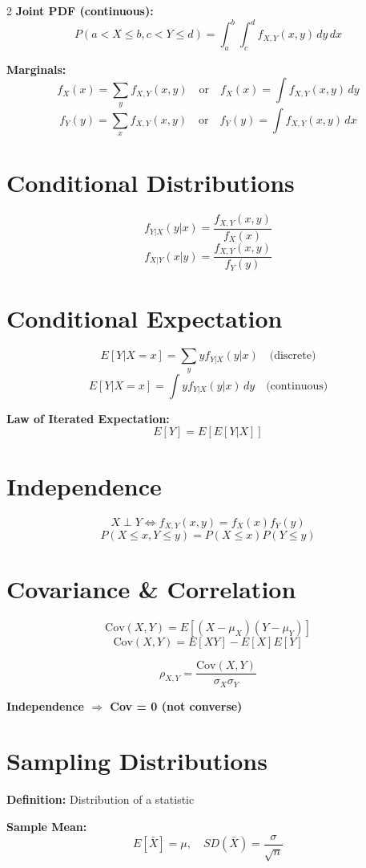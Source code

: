\documentclass[10pt]{article}
\begin{document}
\begin{multicols}{2}
\textbf{Joint PDF (continuous):}
\[
P(a<X\le b, c<Y\le d) = \int_a^b \int_c^d f_{X,Y}(x,y)\,dy\,dx
\]

\textbf{Marginals:}
\[
f_X(x)=\sum_y f_{X,Y}(x,y) \quad \text{or} \quad f_X(x)=\int f_{X,Y}(x,y)\,dy
\]
\[
f_Y(y)=\sum_x f_{X,Y}(x,y) \quad \text{or} \quad f_Y(y)=\int f_{X,Y}(x,y)\,dx
\]

\section*{Conditional Distributions}

\[
f_{Y|X}(y|x) = \frac{f_{X,Y}(x,y)}{f_X(x)}
\]
\[
f_{X|Y}(x|y) = \frac{f_{X,Y}(x,y)}{f_Y(y)}
\]

\section*{Conditional Expectation}

\[
E[Y|X=x] = \sum_y y f_{Y|X}(y|x) \quad \text{(discrete)}
\]
\[
E[Y|X=x] = \int y f_{Y|X}(y|x)\,dy \quad \text{(continuous)}
\]

\textbf{Law of Iterated Expectation:}
\[
E[Y] = E[E[Y|X]]
\]

\section*{Independence}

\[
X \perp Y \iff f_{X,Y}(x,y)=f_X(x)f_Y(y)
\]
\[
P(X\le x, Y\le y)=P(X\le x)P(Y\le y)
\]

\section*{Covariance \& Correlation}

\[
\mathrm{Cov}(X,Y)=E[(X-\mu_X)(Y-\mu_Y)]
\]
\[
\mathrm{Cov}(X,Y)=E[XY]-E[X]E[Y]
\]

\[
\rho_{X,Y} = \frac{\mathrm{Cov}(X,Y)}{\sigma_X \sigma_Y}
\]

\textbf{Independence $\Rightarrow$ Cov = 0 (not converse)}

\section*{Sampling Distributions}

\textbf{Definition:} Distribution of a statistic

\textbf{Sample Mean:}
\[
E[\bar{X}] = \mu, \quad SD(\bar{X}) = \frac{\sigma}{\sqrt{n}}
\]


\end{multicols}
\end{document}
